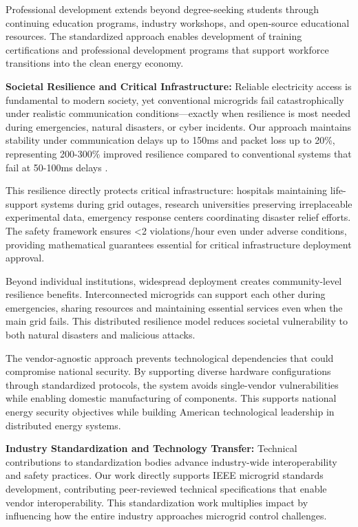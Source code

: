 \documentclass[12pt]{article}
\begin{document}
Professional development extends beyond degree-seeking students through continuing education programs, industry workshops, and open-source educational resources. The standardized approach enables development of training certifications and professional development programs that support workforce transitions into the clean energy economy.

\textbf{Societal Resilience and Critical Infrastructure:} Reliable electricity access is fundamental to modern society, yet conventional microgrids fail catastrophically under realistic communication conditions—exactly when resilience is most needed during emergencies, natural disasters, or cyber incidents. Our approach maintains stability under communication delays up to 150ms and packet loss up to 20\%, representing 200-300\% improved resilience compared to conventional systems that fail at 50-100ms delays \cite{baseline2023delay}.

This resilience directly protects critical infrastructure: hospitals maintaining life-support systems during grid outages, research universities preserving irreplaceable experimental data, emergency response centers coordinating disaster relief efforts. The safety framework ensures <2 violations/hour even under adverse conditions, providing mathematical guarantees essential for critical infrastructure deployment approval.

Beyond individual institutions, widespread deployment creates community-level resilience benefits. Interconnected microgrids can support each other during emergencies, sharing resources and maintaining essential services even when the main grid fails. This distributed resilience model reduces societal vulnerability to both natural disasters and malicious attacks.

The vendor-agnostic approach prevents technological dependencies that could compromise national security. By supporting diverse hardware configurations through standardized protocols, the system avoids single-vendor vulnerabilities while enabling domestic manufacturing of components. This supports national energy security objectives while building American technological leadership in distributed energy systems.

\textbf{Industry Standardization and Technology Transfer:} Technical contributions to standardization bodies advance industry-wide interoperability and safety practices. Our work directly supports IEEE microgrid standards development, contributing peer-reviewed technical specifications that enable vendor interoperability. This standardization work multiplies impact by influencing how the entire industry approaches microgrid control challenges.
\end{document}
